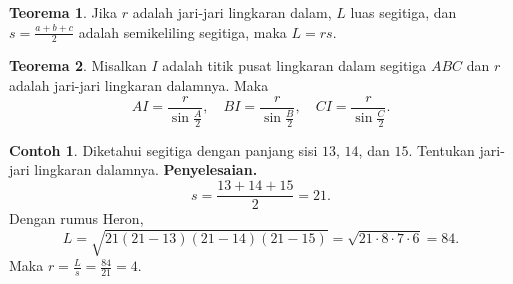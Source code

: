 \documentclass[aspectratio=169]{beamer}
\theoremstyle{definition}
\newtheorem{teorema}{Teorema}
\newtheorem{contoh}{Contoh}
\begin{document}
\begin{frame}{\insertsection}{\insertsubsection}

  \begin{teorema}
    Jika $r$ adalah jari-jari lingkaran dalam, $L$ luas segitiga, dan
    $
      s = \frac{a+b+c}{2}
    $
    adalah semikeliling segitiga, maka
    $
      L = r s.
    $
  \end{teorema}

  \begin{teorema}
    Misalkan $I$ adalah titik pusat lingkaran dalam segitiga $ABC$ dan $r$ adalah jari-jari lingkaran dalamnya. Maka
    \[
      AI=\frac{r}{\sin\frac{A}{2}},\quad
      BI=\frac{r}{\sin\frac{B}{2}},\quad
      CI=\frac{r}{\sin\frac{C}{2}}.
    \]
  \end{teorema}
\end{frame}

\begin{frame}{\insertsection}{\insertsubsection}
  \begin{contoh}
    Diketahui segitiga dengan panjang sisi $13$, $14$, dan $15$.
    Tentukan jari-jari lingkaran dalamnya.
    \vspace{0.6em}
    \textbf{Penyelesaian.}
    \[
      s=\frac{13+14+15}{2}=21.
    \]
    Dengan rumus Heron,
    \[
      L=\sqrt{21(21-13)(21-14)(21-15)}=\sqrt{21\cdot 8\cdot 7\cdot 6}=84.
    \]
    Maka
    $
      r=\frac{L}{s}=\frac{84}{21}=4.
    $
  \end{contoh}
\end{frame}
\end{document}
